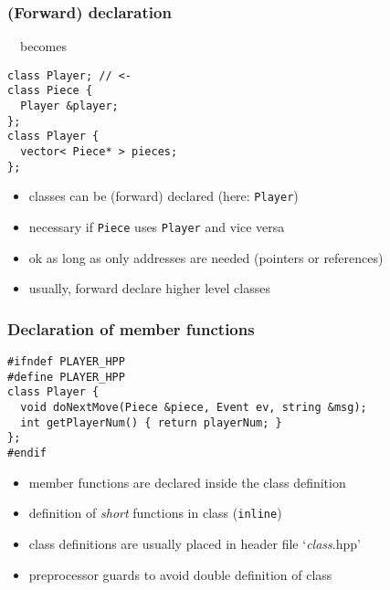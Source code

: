 \documentclass{slides}
\begin{document}
\begin{frame}[fragile]
  \frametitle{(Forward) declaration}

  ~~becomes
  \medskip

\begin{lstlisting}
class Player; // <-
class Piece {
  Player &player;
};
class Player {
  vector< Piece* > pieces;
};
\end{lstlisting}

  \begin{itemize}
  \item classes can be (forward) \alert{declared} (here: \lstinline!Player!)
  \item necessary if \lstinline!Piece! uses \lstinline!Player!
    and vice versa
  \item ok as long as only addresses are needed (pointers or references)
  \item usually, forward declare higher level classes
  \end{itemize}
\end{frame}

\begin{frame}
  \frametitle{Declaration of member functions}

\begin{lstlisting}[title={\footnotesize\bfseries Player.hpp}]
#ifndef PLAYER_HPP
#define PLAYER_HPP
class Player {
  void doNextMove(Piece &piece, Event ev, string &msg);
  int getPlayerNum() { return playerNum; }
};
#endif
\end{lstlisting}

    \begin{itemize}
    \item member functions are declared inside the class definition
    \item definition of \emph{short} functions in class (\lstinline[inline]!inline!)
    \item class definitions are usually placed in header file `\textit{class}.hpp'
    \item preprocessor guards to avoid double definition of class
    \end{itemize}
\end{frame}
\end{document}
